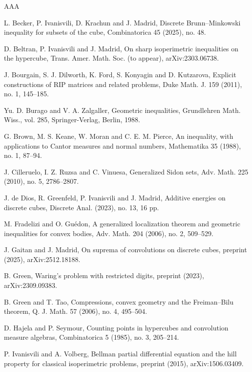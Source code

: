 \documentclass[a4paper,reqno,12pt]{amsart}
\newcommand{\1}{\bo{1}}
\begin{document}
\begin{thebibliography}{AAA}

 L. Becker, P. Ivanisvili, D. Krachun and J. Madrid, Discrete Brunn--Minkowski inequality for subsets of the cube, Combinatorica 45 (2025), no. 48.

 D. Beltran, P. Ivanisvili and J. Madrid, On sharp isoperimetric inequalities on the hypercube, Trans. Amer. Math. Soc. (to appear), arXiv:2303.06738.

 J. Bourgain, S. J. Dilworth, K. Ford, S. Konyagin and D. Kutzarova, Explicit constructions of RIP matrices and related problems, Duke Math. J. 159 (2011), no. 1, 145--185.

 Yu. D. Burago and V. A. Zalgaller, Geometric inequalities, Grundlehren Math. Wiss., vol. 285, Springer-Verlag, Berlin, 1988.

 G. Brown, M. S. Keane, W. Moran and C. E. M. Pierce, An inequality, with applications to Cantor measures and normal numbers, Mathematika 35 (1988), no. 1, 87--94.

 J. Cilleruelo, I. Z. Ruzsa and C. Vinuesa, Generalized Sidon sets, Adv. Math. 225 (2010), no. 5, 2786--2807.

 J. de Dios, R. Greenfeld, P. Ivanisvili and J. Madrid, Additive energies on discrete cubes, Discrete Anal. (2023), no. 13, 16 pp.

 M. Fradelizi and O. Gu\'edon, A generalized localization theorem and geometric inequalities for convex bodies, Adv. Math. 204 (2006), no. 2, 509--529.

 J. Gaitan and J. Madrid, On suprema of convolutions on discrete cubes, preprint (2025), arXiv:2512.18188.

 B. Green, Waring's problem with restricted digits, preprint (2023), arXiv:2309.09383.

 B. Green and T. Tao, Compressions, convex geometry and the Freiman--Bilu theorem, Q. J. Math. 57 (2006), no. 4, 495--504.

 D. Hajela and P. Seymour, Counting points in hypercubes and convolution measure algebras, Combinatorica 5 (1985), no. 3, 205--214.

 P. Ivanisvili and A. Volberg, Bellman partial differential equation and the hill property for classical isoperimetric problems, preprint (2015), arXiv:1506.03409.


\end{thebibliography}
\end{document}
